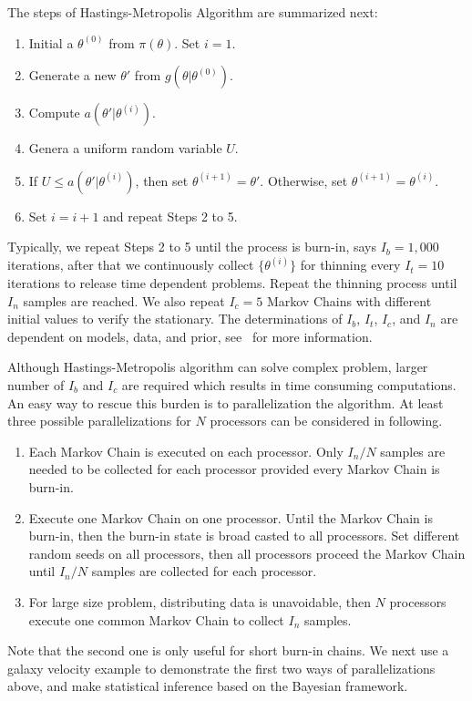 The steps of Hastings-Metropolis Algorithm are summarized next:
\begin{enumerate}[label=Step \arabic*:]
\item Initial a $\theta^{(0)}$ from $\pi(\theta)$. Set $i = 1$.

\item Generate a new $\theta'$ from $g(\theta | \theta^{(0)})$.

\item Compute $a(\theta' | \theta^{(i)})$.

\item Genera a uniform random variable $U$.

\item If $U \leq a(\theta' | \theta^{(i)})$, then set
      $\theta^{(i + 1)} = \theta'$. Otherwise, set
      $\theta^{(i + 1)} = \theta^{(i)}$.

\item Set $i = i + 1$ and repeat Steps 2 to 5.
\end{enumerate}
Typically, we repeat Steps 2 to 5 until the process is burn-in, says
$I_b = 1,000$ iterations, after that we continuously collect $\{\theta^{(i)}\}$
for thinning every $I_t = 10$ iterations to release time dependent problems.
Repeat the thinning process until $I_n$ samples are reached. We also repeat
$I_c = 5$ Markov Chains with different initial values to verify the stationary.
The determinations of $I_b$, $I_t$, $I_c$,  and $I_n$ are dependent on models,
data, and prior, see~\citet{winbugs} for more information.

Although Hastings-Metropolis algorithm can solve complex problem, larger
number of $I_b$ and $I_c$ are required which results in time consuming
computations. An easy way to rescue this burden is to parallelization
the algorithm. At least three possible parallelizations for $N$ processors
can be considered in following.
\begin{enumerate}
\item Each Markov Chain is executed on each processor.
      Only $I_n / N$ samples are needed to be collected for each processor
      provided every Markov Chain is burn-in.
\item Execute one Markov Chain on one processor. Until the Markov Chain
      is burn-in, then the burn-in state is broad casted to all processors.
      Set different random seeds on all processors, then all processors
      proceed the Markov Chain until $I_n / N$ samples are collected for each
      processor.
\item For large size problem, distributing data is unavoidable, then $N$
      processors execute one common Markov Chain to collect $I_n$ samples.
\end{enumerate}
Note that the second one is only useful for short burn-in chains.
We next use a galaxy velocity example to demonstrate the first two ways of 
parallelizations above, and make statistical inference based on the
Bayesian framework.




